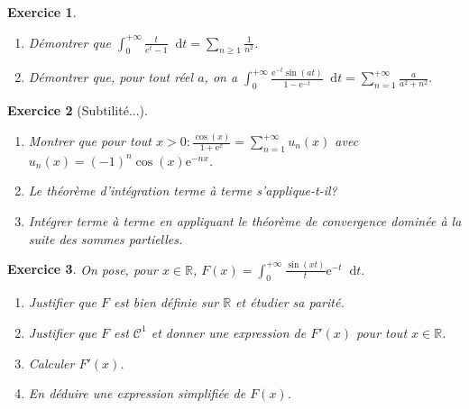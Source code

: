 \documentclass[12pt,a4paper]{article}
\newcommand{\E}{\mathrm{e}}
\newcommand{\diff}{\mathop{}\mathopen{}\mathrm{d}}%
{%
\theoremstyle{break}
\theoremprework{%
\rule{0.5\linewidth}{0.3pt}}
\theorempostwork{\hfill%
\rule{0.5\linewidth}{0.3pt}}
\theoremheaderfont{\scshape}
\theoremseparator{ ---}
\newtheorem{Prop}{%
\textcolor{blue}{Proposition}}[section]
}
\theoremstyle{break}
\newtheorem{Exo}{Exercice}
\begin{document}
%
%


\begin{Exo}\ 
	\begin{enumerate}
		\item Démontrer que $\int_0^{+\infty}\frac{t}{e^t-1}\diff t=\sum_{n\geq 1}\frac 1{n^2}$.
		\item Démontrer que, pour tout  réel $a$, on a
		$\int_0^{+\infty}\frac{\E^{-t}\sin(at)}{1-\E^{-t}}\diff t=\sum_{n=1}^{+\infty}\frac a{a^2+n^2}.$
	\end{enumerate}
\end{Exo}

	\begin{Exo}[Subtilité...]\ 
		\begin{enumerate}
			\item
			Montrer que pour tout $x>0:\frac{\cos(x)}{1+\E^x}=\sum_{n=1}^{+\infty}u_n(x)$ avec $u_n(x)=(-1)^n\cos(x)\E^{-nx}$.
			\item
			Le théorème d'intégration terme à terme s'applique-t-il?
			\item
			Intégrer terme à terme en appliquant le théorème de convergence dominée à la suite des sommes partielles.
		\end{enumerate}
\end{Exo}

\begin{Exo}
	On pose, pour $x\in\mathbb R$, 
	$F(x)=\int_0^{+\infty}\frac{\sin(xt)}t\E^{-t}\diff t.$
	\begin{enumerate}
		\item Justifier que $F$ est bien définie sur $\mathbb R$ et étudier sa parité.
		\item Justifier que $F$ est $\mathcal C^1$ et donner une expression de $F'(x)$ pour tout $x\in\mathbb R$.
		\item Calculer $F'(x)$.
		\item En déduire une expression simplifiée de $F(x)$.
	\end{enumerate}
\end{Exo}
\end{document}
